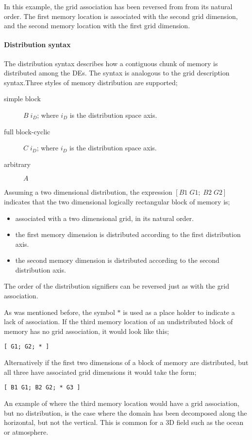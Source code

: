In this example, the grid association has been reversed from from its natural order. The first memory location is associated with the second grid dimension, and the second memory location with the first grid dimension. 

\paragraph{Distribution syntax}
The distribution syntax describes how a contiguous chunk of memory is distributed among the DEs. The syntax is analogous to the grid description syntax.Three styles of memory distribution are supported;
\begin{description}
   \item[simple block] $B \; i_D$; where $i_D$ is the distribution space axis.
   \item[full block-cyclic] $C \; i_D$; where $i_D$ is the distribution space axis.  
   \item[arbitrary] $A$ 
\end{description}
Assuming a two dimensional distribution, the expression $[ B1 \; G1; \; B2 \; G2 ]$ indicates that the two dimensional logically rectangular block of memory is;
\begin{itemize}
	\item associated with a two dimensional grid, in its natural order.
	\item the first memory dimension is distributed according to the first distribution axis.
	\item the second memory dimension is distributed according to the second distribution axis.
\end{itemize}
The order of the distribution signifiers can be reversed just as with the grid association. 

As was mentioned before, the symbol $\ast$ is used as a place holder to indicate a lack of association. If the third memory location of an undistributed block of memory has no grid association, it would look like this;
\begin{center}
\begin{verbatim}
[ G1; G2; * ]
\end{verbatim}
\end{center}
Alternatively if the first two dimensions of a block of memory are distributed, but all three have associated grid dimensions it would take the form;
\begin{center}
\begin{verbatim}
[ B1 G1; B2 G2; * G3 ]
\end{verbatim}
\end{center}
An example of where the third memory location would have a grid association, but no distribution, is the case where the domain has been decomposed along the horizontal, but not the vertical. This is common for a 3D field such as the ocean or atmosphere. 

